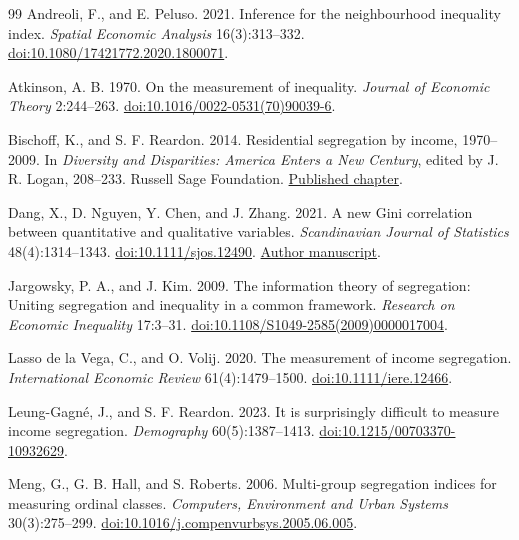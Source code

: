\documentclass[11pt]{article}
\begin{document}
\begin{thebibliography}{99}\small
{}
Andreoli, F., and E. Peluso. 2021.
Inference for the neighbourhood inequality index.
\emph{Spatial Economic Analysis} 16(3):313--332.
\href{https://doi.org/10.1080/17421772.2020.1800071}{doi:10.1080/17421772.2020.1800071}.

Atkinson, A. B. 1970. On the measurement of inequality.
\emph{Journal of Economic Theory} 2:244--263.
\href{https://doi.org/10.1016/0022-0531(70)90039-6}{doi:10.1016/0022-0531(70)90039-6}.

Bischoff, K., and S. F. Reardon. 2014.
Residential segregation by income, 1970--2009.
In \emph{Diversity and Disparities: America Enters a New Century},
edited by J. R. Logan, 208--233. Russell Sage Foundation.
\href{https://www.russellsage.org/sites/all/files/logan/logan_diversity_chapter7.pdf}{Published chapter}.

Dang, X., D. Nguyen, Y. Chen, and J. Zhang. 2021.
A new Gini correlation between quantitative and qualitative variables.
\emph{Scandinavian Journal of Statistics} 48(4):1314--1343.
\href{https://doi.org/10.1111/sjos.12490}{doi:10.1111/sjos.12490}.
\href{https://home.olemiss.edu/~xdang/papers/CategoricalGini.pdf}{Author manuscript}.

Jargowsky, P. A., and J. Kim. 2009.
The information theory of segregation: Uniting segregation and inequality in a common framework.
\emph{Research on Economic Inequality} 17:3--31.
\href{https://doi.org/10.1108/S1049-2585(2009)0000017004}{doi:10.1108/S1049-2585(2009)0000017004}.

Lasso de la Vega, C., and O. Volij. 2020.
The measurement of income segregation.
\emph{International Economic Review} 61(4):1479--1500.
\href{https://doi.org/10.1111/iere.12466}{doi:10.1111/iere.12466}.

Leung-Gagn\'e, J., and S. F. Reardon. 2023.
It is surprisingly difficult to measure income segregation.
\emph{Demography} 60(5):1387--1413.
\href{https://doi.org/10.1215/00703370-10932629}{doi:10.1215/00703370-10932629}.

Meng, G., G. B. Hall, and S. Roberts. 2006.
Multi-group segregation indices for measuring ordinal classes.
\emph{Computers, Environment and Urban Systems} 30(3):275--299.
\href{https://doi.org/10.1016/j.compenvurbsys.2005.06.005}{doi:10.1016/j.compenvurbsys.2005.06.005}.


\end{thebibliography}
\end{document}
